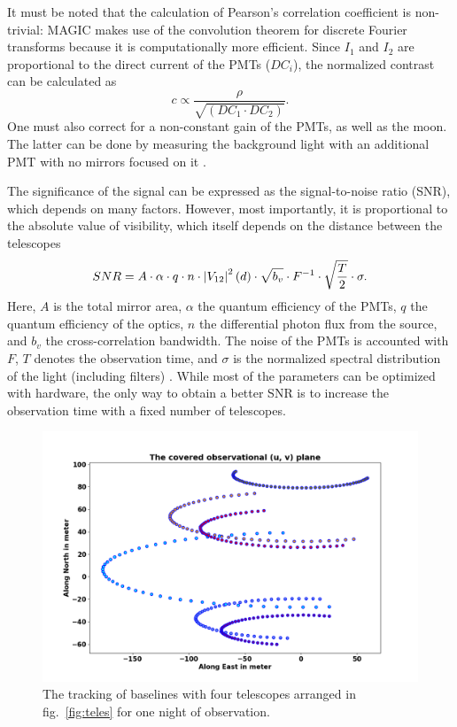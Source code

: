 It must be noted that the calculation of Pearson's correlation coefficient is non-trivial: MAGIC makes use of the convolution theorem for discrete Fourier transforms because it is computationally more efficient. Since $I_1$ and $I_2$ are proportional to the direct current of the PMTs ($DC_i$), the normalized contrast can be calculated as 
\begin{equation}
	c \propto \frac{\rho}{\sqrt{\left(DC_1 \cdot DC_2 \right)}}.
	\label{eq:norm_contrast2}
\end{equation}
One must also correct for a non-constant gain of the PMTs, as well as the moon. The latter can be done by measuring the background light with an additional PMT with no mirrors focused on it \citep{acciari2020optical}.

The significance of the signal can be expressed as the signal-to-noise ratio (SNR), which depends on many factors. However, most importantly, it is proportional to the absolute value of visibility, which itself depends on the distance between the telescopes \citep{acciari2020optical} 
\begin{equation}
	SNR = A \cdot \alpha \cdot q \cdot n \cdot \left|V_{12}\right|^{2}(d) \cdot \sqrt{b_v} \cdot F^{-1} \cdot \sqrt{\frac{T}{2}} \cdot \sigma.
	\label{eq:SNR}
\end{equation}
Here, $A$ is the total mirror area, $\alpha$ the quantum efficiency of the PMTs, $q$ the quantum efficiency of the optics, $n$ the differential photon flux from the source, and $b_v$ the cross-correlation bandwidth. The noise of the PMTs is accounted with $F$, $T$ denotes the observation time, and $\sigma$ is the normalized spectral distribution of the light (including filters) \citep{acciari2020optical}. While most of the parameters can be optimized with hardware, the only way to obtain a better SNR is to increase the observation time with a fixed number of telescopes.  
\begin{figure}
	\centering
	\includegraphics[width=\linewidth]{fig/baseline.png}
	\caption{The tracking of baselines with four telescopes arranged in fig.~\ref{fig:teles} for one night of observation.}
	\label{fig:base}
\end{figure}
